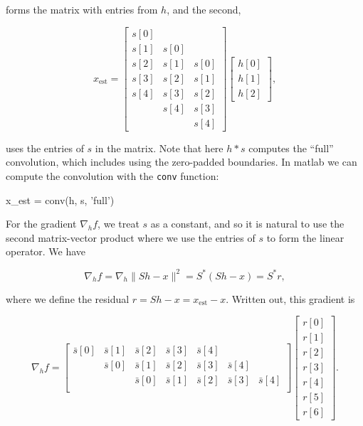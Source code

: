 \documentclass[journal]{IEEEtran}
\begin{document}
\noindent forms the matrix with entries from $h$, and the second,

\[ x_\text{est} = \begin{bmatrix} s[0]\\s[1]&s[0]\\s[2]&s[1]&s[0]\\s[3]&s[2]&s[1]\\s[4]&s[3]&s[2]\\&s[4]&s[3]\\&&s[4]\end{bmatrix}\begin{bmatrix}h[0]\\h[1]\\h[2]\end{bmatrix}, \] 

\noindent uses the entries of $s$ in the matrix.  Note that here $h\ast s$ computes the ``full'' convolution, which includes using the zero-padded boundaries.  In {\sc matlab} we can compute the convolution with the \verb|conv| function:

\begin{verb}
   x_est = conv(h, s, 'full')
\end{verb}

For the gradient $\nabla_hf$, we treat $s$ as a constant, and so it is natural to use the second matrix-vector product where we use the entries of $s$ to form the linear operator.  We have

\[ \nabla_hf = \nabla_h\|Sh-x\|^2 = S^\ast(Sh-x) = S^\ast r, \] 

\noindent where we define the residual $r=Sh-x = x_\text{est}-x$.  Written out, this gradient is

\[ \nabla_h f = \begin{bmatrix} \bar{s}[0]&\bar{s}[1]&\bar{s}[2]&\bar{s}[3]&\bar{s}[4]\\&\bar{s}[0]&\bar{s}[1]&\bar{s}[2]&\bar{s}[3]&\bar{s}[4]\\&&\bar{s}[0]&\bar{s}[1]&\bar{s}[2]&\bar{s}[3]&\bar{s}[4]\\\end{bmatrix}\begin{bmatrix}r[0]\\r[1]\\r[2]\\r[3]\\r[4]\\r[5]\\r[6]\end{bmatrix}. \] 
\end{document}
